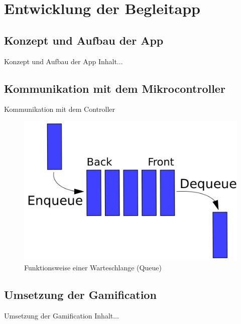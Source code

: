 \documentclass[hyphens]{beamer}
\begin{document}
\section{Entwicklung der Begleitapp}

\subsection{Konzept und Aufbau der App}

\begin{frame}{Konzept und Aufbau der App}
Inhalt...
\end{frame}

\subsection{Kommunikation mit dem Mikrocontroller}

\begin{frame}{Kommunikation mit dem Controller}
	\begin{figure}
		\includegraphics[scale=0.28]{pics/queue}
		\caption{Funktionsweise einer Warteschlange (Queue)}
	\end{figure}
\end{frame}

\subsection{Umsetzung der Gamification}

\begin{frame}{Umsetzung der Gamification}
Inhalt...
\end{frame}
\end{document}
